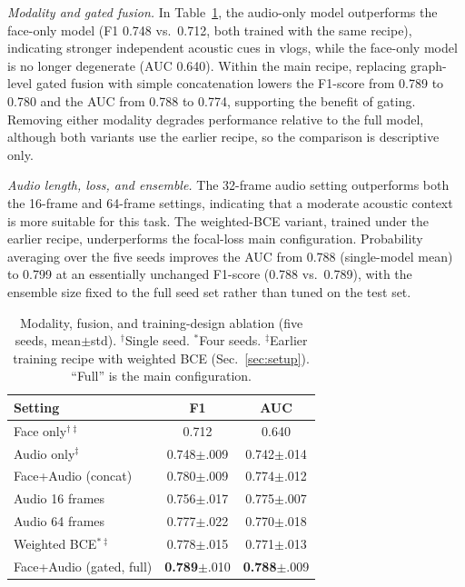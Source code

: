 \documentclass[conference]{IEEEtran}
\begin{document}
\textit{Modality and gated fusion.}
In Table~\ref{tab:fusion_design}, the audio-only model outperforms the face-only model (F1 0.748 vs.\ 0.712, both trained with the same recipe), indicating stronger independent acoustic cues in vlogs, while the face-only model is no longer degenerate (AUC 0.640). Within the main recipe, replacing graph-level gated fusion with simple concatenation lowers the F1-score from 0.789 to 0.780 and the AUC from 0.788 to 0.774, supporting the benefit of gating. Removing either modality degrades performance relative to the full model, although both variants use the earlier recipe, so the comparison is descriptive only.

\textit{Audio length, loss, and ensemble.}
The 32-frame audio setting outperforms both the 16-frame and 64-frame settings, indicating that a moderate acoustic context is more suitable for this task. The weighted-BCE variant, trained under the earlier recipe, underperforms the focal-loss main configuration. Probability averaging over the five seeds improves the AUC from 0.788 (single-model mean) to 0.799 at an essentially unchanged F1-score (0.788 vs.\ 0.789), with the ensemble size fixed to the full seed set rather than tuned on the test set.

\begin{table}[!t]
\centering
\caption{Modality, fusion, and training-design ablation (five seeds, mean$\pm$std). $^\dagger$Single seed. $^*$Four seeds. $^\ddagger$Earlier training recipe with weighted BCE (Sec.~\ref{sec:setup}). ``Full'' is the main configuration.}
\label{tab:fusion_design}
\scriptsize
\setlength{\tabcolsep}{3pt}
\begin{tabular}{lcc}
\toprule[1.2pt]
Setting & F1 & AUC \\
\midrule[0.8pt]
Face only$^{\dagger\ddagger}$ & 0.712 & 0.640 \\
Audio only$^\ddagger$ & 0.748{\scriptsize$\pm$.009} & 0.742{\scriptsize$\pm$.014} \\
Face+Audio (concat) & 0.780{\scriptsize$\pm$.009} & 0.774{\scriptsize$\pm$.012} \\
Audio 16 frames & 0.756{\scriptsize$\pm$.017} & 0.775{\scriptsize$\pm$.007} \\
Audio 64 frames & 0.777{\scriptsize$\pm$.022} & 0.770{\scriptsize$\pm$.018} \\
Weighted BCE$^{*\ddagger}$ & 0.778{\scriptsize$\pm$.015} & 0.771{\scriptsize$\pm$.013} \\
\midrule[0.8pt]
Face+Audio (gated, full) & \textbf{0.789}{\scriptsize$\pm$.010} & \textbf{0.788}{\scriptsize$\pm$.009} \\
\bottomrule[1.2pt]
\end{tabular}
\end{table}
\end{document}
